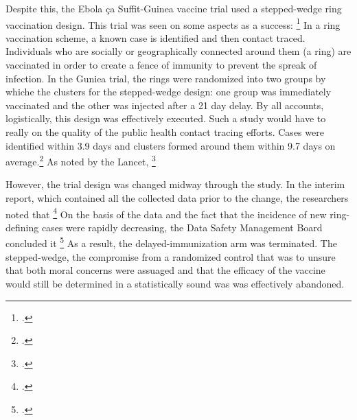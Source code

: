 \documentclass[letterpaper,notitlepage,12pt]{article}
\begin{document}
Despite this, the Ebola \c{c}a Suffit-Guinea vaccine trial used a stepped-wedge
ring vaccination design.
This trial was seen on some aspects as a success: \footcite{NAP}
In a ring vaccination scheme, a known case is identified and then contact
traced.
Individuals who are socially or geographically connected around them (a ring)
are vaccinated in order to create a fence of immunity to prevent the spreak of
infection.
In the Guniea trial, the rings were randomized into two groups by whiche the
clusters for the stepped-wedge design: one group was immediately vaccinated and
the other was injected after a 21 day delay.
By all accounts, logistically, this design was effectively executed.
Such a study would have to really on the quality of the public health contact
tracing efforts.
Cases were identified within 3.9 days and clusters formed around them within 9.7
days on average.\footcite{HR 2016}
As noted by the Lancet, \footcite{lancet 2015}

However, the trial design was changed midway through the study.
In the interim report, which contained all the collected data prior to the
change, the researchers noted that \footcite[p. 857]{HR 2015}
On the basis of the data and the fact that the incidence of new ring-defining
cases were rapidly decreasing, the Data Safety Management Board concluded it
\footcite{UF 2015} 
As a result, the delayed-immunization arm was terminated.
The stepped-wedge, the compromise from a randomized control that was to unsure
that both moral concerns were assuaged and that the efficacy of the vaccine
would still be determined in a statistically sound was was effectively
abandoned.
\end{document}
